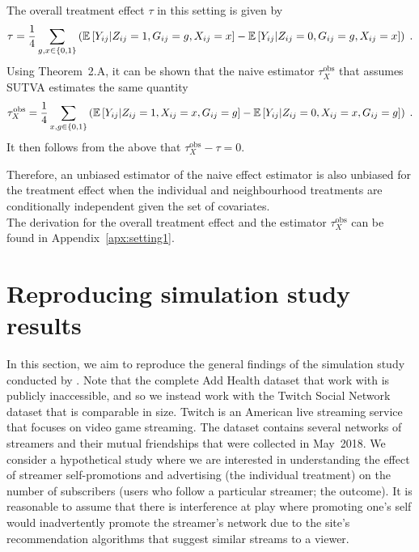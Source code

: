 \documentclass[10pt]{article}
\begin{document}
The overall treatment effect $\tau$ in this setting is given by
\[
\tau = \frac{1}{4}\sum_{g,x\in\{0,1\}} \left(\mathbb{E}\left[Y_{ij}|Z_{ij}=1,G_{ij}=g,X_{ij}=x\right] - \mathbb{E}\left[Y_{ij}|Z_{ij}=0,G_{ij}=g,X_{ij}=x\right]\right) \;.
\]
Using Theorem~2.A, it can be shown that the naive estimator $\tau_{X}^\text{obs}$ that assumes SUTVA estimates the same quantity
\[
\tau_{X}^\text{obs} = \frac{1}{4}\sum_{x,g\in\{0,1\}}\left(\mathbb{E}\left[Y_{ij}|Z_{ij}=1,X_{ij}=x,G_{ij}=g\right] - \mathbb{E}\left[Y_{ij}|Z_{ij}=0,X_{ij}=x,G_{ij}=g\right]\right) \;.
\]
It then follows from the above that $\tau_{X}^\text{obs}-\tau = 0$.
\iffalse
and Assumptions~1 and 3 that
\begin{align*}
&\tau_{X}^\text{obs}-\tau \\
&= \tau_{X}^\text{obs} - \frac{1}{2}\left(\mu(1,0) + \mu(1,1) - \mu(0,0) - \mu(0,1)\right) \\
&= \tau_{X}^\text{obs} - \frac{1}{2}\sum_{x\in\{0,1\}}\left(\E\left[Y_{ij}|Z_{ij}=1,X_{ij}=x,G_{ij}=0\right] + \E\left[Y_{ij}|Z_{ij}=1,X_{ij}=x,G_{ij}=1\right]\right. \\
&\quad - \left.\E\left[Y_{ij}|Z_{ij}=0,X_{ij}=x,G_{ij}=0\right] - \E\left[Y_{ij}|Z_{ij}=0,X_{ij}=x,G_{ij}=1\right]\right)\P(X_{ij}=x) \\
&= 0 \;.
\end{align*}
\fi
Therefore, an unbiased estimator of the naive effect estimator is also unbiased for the treatment effect when the individual and neighbourhood treatments are conditionally independent given the set of covariates.
\\

The derivation for the overall treatment effect and the estimator $\tau_{X}^\text{obs}$ can be found in Appendix~\ref{apx:setting1}.


\section{Reproducing simulation study results}

In this section, we aim to reproduce the general findings of the simulation study conducted by \textcite{Forastiere:2021}. Note that the complete Add Health dataset that \citeauthor{Forastiere:2021} work with is publicly inaccessible, and so we instead work with the Twitch Social Network dataset \parencite{Rozemberczki:2021} that is comparable in size. Twitch is an American live streaming service that focuses on video game streaming. The dataset contains several networks of streamers and their mutual friendships that were collected in May~2018. We consider a hypothetical study where we are interested in understanding the effect of streamer self-promotions and advertising (the individual treatment) on the number of subscribers (users who follow a particular streamer; the outcome). It is reasonable to assume that there is interference at play where promoting one's self would inadvertently promote the streamer's network due to the site's recommendation algorithms that suggest similar streams to a viewer.
\\
\end{document}
